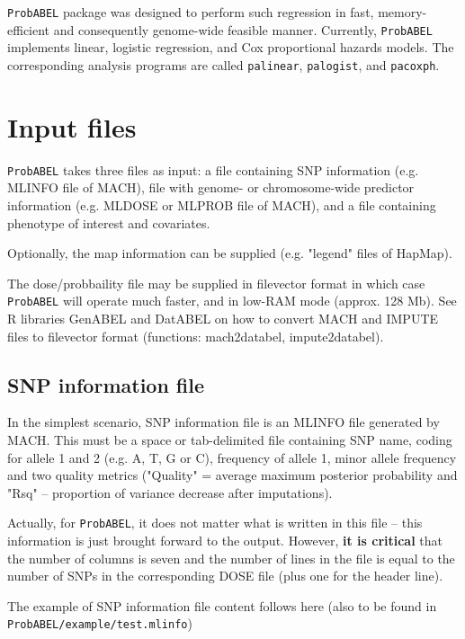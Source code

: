 \documentclass[12pt,a4paper]{article}
\begin{document}
\texttt{ProbABEL} package was designed to perform such regression in fast, 
memory-efficient and consequently genome-wide feasible manner. 
Currently, \texttt{ProbABEL} implements linear, logistic regression, 
and Cox proportional hazards models. The corresponding analysis 
programs are called \texttt{palinear},  \texttt{palogist},  
and \texttt{pacoxph}.


\section{Input files}
\texttt{ProbABEL} takes three files as input: a file containing SNP 
information (e.g. MLINFO file of MACH), file with genome- or 
chromosome-wide predictor information (e.g. MLDOSE or MLPROB file of MACH), 
and a file containing phenotype of interest and covariates. 

Optionally, the map information can be supplied (e.g. "legend" 
files of HapMap). 

The dose/probbaility file may be supplied in filevector format 
in which case \texttt{ProbABEL} will operate much faster, and 
in low-RAM mode (approx. 128 Mb). See R libraries GenABEL and 
DatABEL on how to convert MACH and IMPUTE files to 
filevector format (functions: mach2databel, impute2databel).

\subsection{SNP information file}
\label{ssec:infoin}
In the simplest scenario, SNP information file is an MLINFO 
file generated by MACH. This must be a space or tab-delimited file 
containing SNP name, coding for allele 1 and 2 (e.g. A, T, G or C), 
frequency of allele 1, minor allele frequency and two quality 
metrics ("Quality" = average maximum posterior probability and 
"Rsq" -- proportion of variance decrease after imputations). 

Actually, 
for \texttt{ProbABEL}, it does not matter what is written in this file -- 
this information is just brought forward to the output. However, 
\textbf{it is critical} that the number of columns is seven and the number 
of lines in the file is equal to the number of SNPs in the 
corresponding DOSE file (plus one for the header line). 

The example of SNP information file content follows here (also 
to be found in \texttt{ProbABEL/example/test.mlinfo})


\end{document}
